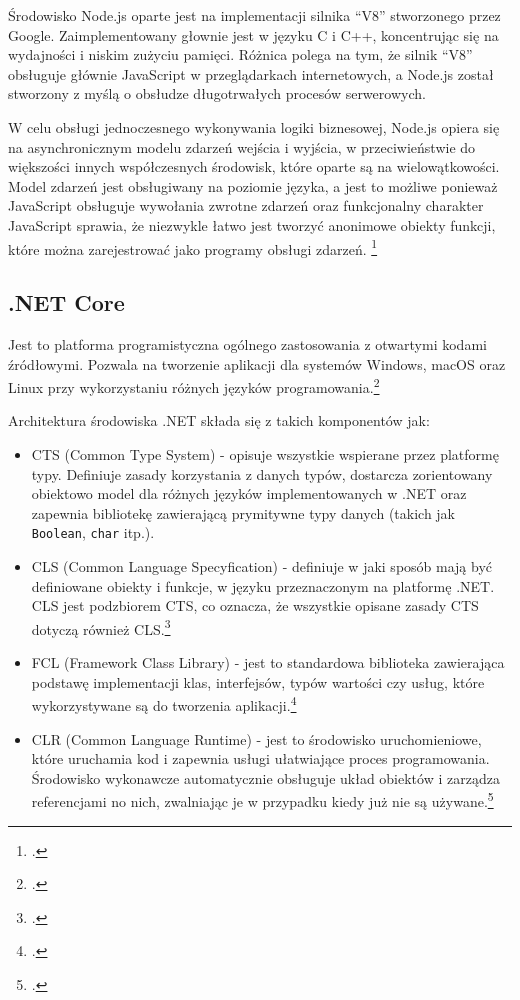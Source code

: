 \par Środowisko Node.js oparte jest na implementacji silnika ``V8'' stworzonego przez Google. Zaimplementowany głownie jest w języku C i C++, koncentrując się na wydajności i niskim zużyciu pamięci. Różnica polega na tym, że silnik ``V8'' obsługuje głównie JavaScript w przeglądarkach internetowych, a Node.js został stworzony z myślą o obsłudze długotrwałych procesów serwerowych.
\par W celu obsługi jednoczesnego wykonywania logiki biznesowej, Node.js opiera się na asynchronicznym modelu zdarzeń wejścia i wyjścia, w przeciwieństwie do większości innych współczesnych środowisk, które oparte są na wielowątkowości. Model zdarzeń jest obsługiwany na poziomie języka, a jest to możliwe ponieważ JavaScript obsługuje wywołania zwrotne zdarzeń oraz funkcjonalny charakter JavaScript sprawia, że niezwykle łatwo jest tworzyć anonimowe obiekty funkcji, które można zarejestrować jako programy obsługi zdarzeń. \footcite{Tilkov2010}

\subsection{.NET Core}

\par Jest to platforma programistyczna ogólnego zastosowania z otwartymi kodami źródłowymi. Pozwala na tworzenie aplikacji dla systemów Windows, macOS oraz Linux przy wykorzystaniu różnych języków programowania.\footcite{dotNetvsFramework}
\par Architektura środowiska .NET składa się z takich komponentów jak:
\begin{itemize}
  \item CTS (Common Type System) - opisuje wszystkie wspierane przez platformę typy. Definiuje zasady korzystania z danych typów, dostarcza zorientowany obiektowo model dla różnych języków implementowanych w .NET oraz zapewnia bibliotekę zawierającą prymitywne typy danych (takich jak \texttt{Boolean}, \texttt{char} itp.).
  \item CLS (Common Language Specyfication) - definiuje w jaki sposób mają być definiowane obiekty i funkcje, w języku przeznaczonym na platformę .NET. CLS jest podzbiorem CTS, co oznacza, że wszystkie opisane zasady CTS dotyczą również CLS.\footcite{dotNetCLS}
  \item FCL (Framework Class Library) - jest to standardowa biblioteka zawierająca podstawę implementacji klas, interfejsów, typów wartości czy usług, które wykorzystywane są do tworzenia aplikacji.\footcite{dotNetFCL}
  \item CLR (Common Language Runtime) - jest to środowisko uruchomieniowe, które uruchamia kod i zapewnia usługi ułatwiające proces programowania. Środowisko wykonawcze automatycznie obsługuje układ obiektów i zarządza referencjami no nich, zwalniając je w przypadku kiedy już nie są używane.\footcite{dotNetCLR}
  
\end{itemize}

